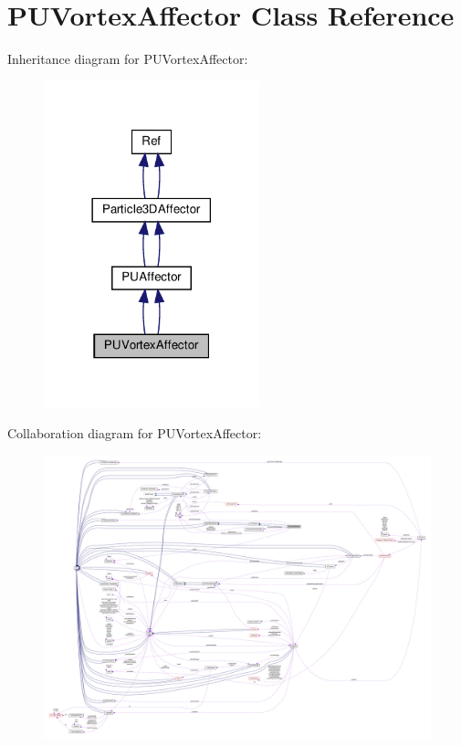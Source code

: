 \hypertarget{classPUVortexAffector}{}\section{P\+U\+Vortex\+Affector Class Reference}
\label{classPUVortexAffector}


Inheritance diagram for P\+U\+Vortex\+Affector\+:
\nopagebreak
\begin{figure}[H]
\begin{center}
\leavevmode
\includegraphics[width=177pt]{classPUVortexAffector__inherit__graph}
\end{center}
\end{figure}


Collaboration diagram for P\+U\+Vortex\+Affector\+:
\nopagebreak
\begin{figure}[H]
\begin{center}
\leavevmode
\includegraphics[width=350pt]{classPUVortexAffector__coll__graph}
\end{center}
\end{figure}
